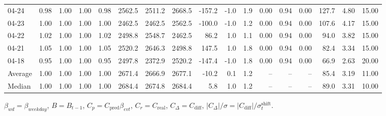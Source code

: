 \begin{threeparttable}
{\begin{tabular}{lrrrrrrrrrrrrrrrr}
  04-24 &         0.98 &           1.00 &          1.00 &          0.98 & 2562.5 & 2511.2 & 2668.5 &     -157.2 &                     -1.0 &                 1.9 &       0.00 &      0.94 &           0.00 &            127.7 &            4.80 &                  15.00 \\
  04-23 &         1.00 &           1.00 &          1.00 &          1.00 & 2462.5 & 2462.5 & 2562.5 &     -100.0 &                     -1.0 &                 1.2 &       0.00 &      0.94 &           0.00 &            107.6 &            4.17 &                  15.00 \\
  04-22 &         1.02 &           1.00 &          1.00 &          1.02 & 2498.8 & 2548.7 & 2462.5 &       86.2 &                      1.0 &                 1.1 &       0.00 &      0.94 &           0.00 &             94.0 &            3.82 &                  15.00 \\
  04-21 &         1.05 &           1.00 &          1.00 &          1.05 & 2520.2 & 2646.3 & 2498.8 &      147.5 &                      1.0 &                 1.8 &       0.00 &      0.94 &           0.00 &             82.4 &            3.34 &                  15.00 \\
  04-18 &         0.95 &           1.00 &          1.00 &          0.95 & 2497.8 & 2372.9 & 2520.2 &     -147.4 &                     -1.0 &                 1.8 &       0.00 &      0.94 &           0.00 &             66.9 &            2.63 &                  20.00 \\
Average &         1.00 &           1.00 &          1.00 &          1.00 & 2671.4 & 2666.9 & 2677.1 &      -10.2 &                      0.1 &                 1.2 &         -- &        -- &             -- &             85.4 &            3.19 &                  11.00 \\
 Median &         1.00 &           1.00 &          1.00 &          1.00 & 2684.4 & 2674.8 & 2684.4 &        5.8 &                      1.0 &                 1.2 &         -- &        -- &             -- &             89.0 &            3.31 &                  10.00 \\
\bottomrule
\end{tabular}
}
\begin{tablenotes}\footnotesize
\item $\beta_{wd}=\beta_{weekday}$, $B=B_{t-1}$,
$C_p=C_{\text{pred}}\beta_{evt}$, $C_r=C_{\text{real}}$,
$C_\Delta=C_{\text{diff}}$, $|C_\Delta|/\sigma=|C_{\text{diff}}|/\sigma_t^{\text{shift}}$.
\end{tablenotes}
\end{threeparttable}
\endgroup
